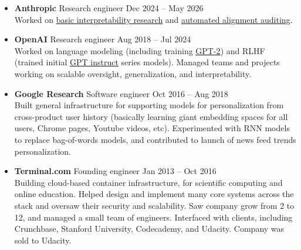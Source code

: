 \documentclass[11 pt]{article}
\begin{document}
\begin{itemize}



\item \textbf{Anthropic} Research engineer \hfill Dec 2024 -- May 2026 \\
  Worked on \href{https://transformer-circuits.pub/2026/nla/}{basic interpretability research} and \href{https://alignment.anthropic.com/2025/automated-auditing/}{automated alignment auditing}.

\item \textbf{OpenAI} Research engineer \hfill Aug 2018 -- Jul 2024 \\
  Worked on language modeling (including training \href{https://openai.com/blog/better-language-models/}{GPT-2}) and RLHF (trained initial \href{https://openai.com/blog/instruction-following/}{GPT instruct} series models).  Managed teams and projects working on scalable oversight, generalization, and interpretability.


\item \textbf{Google Research} Software engineer \hfill Oct 2016 -- Aug 2018 \\
Built general infrastructure
for supporting models for personalization from cross-product user history (basically learning giant embedding spaces for all users, Chrome pages, Youtube videos, etc).
Experimented with RNN models to replace bag-of-words models, and contributed to launch of news feed trends personalization.


\item \textbf{Terminal.com} Founding engineer \hfill Jan 2013 -- Oct 2016 \\
Building cloud-based container infrastructure, for scientific computing and online education.
Helped design and implement many core systems across the stack %
and oversaw their security and scalability.
Saw company grow from 2 to 12, and managed a small team of engineers.
Interfaced with clients, including Crunchbase, Stanford University, Codecademy, and Udacity.
Company was sold to Udacity.


\end{itemize}
\end{document}
